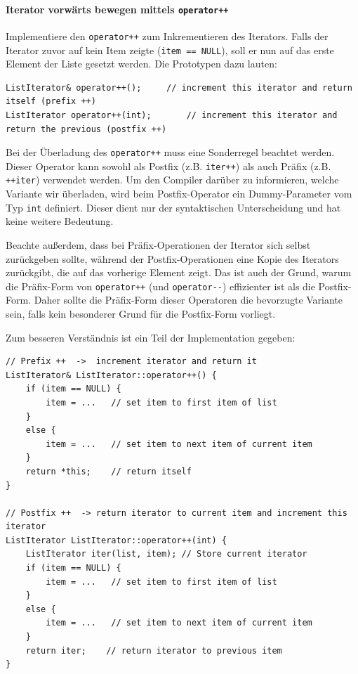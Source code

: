 \paragraph{Iterator vorwärts bewegen mittels \texttt{operator++}}

Implementiere den \texttt{operator++} zum Inkrementieren des Iterators.
Falls der Iterator zuvor auf kein Item zeigte (\texttt{item == NULL}), soll er nun auf das erste Element der Liste gesetzt werden.
Die Prototypen dazu lauten:
\begin{lstlisting}
ListIterator& operator++();		// increment this iterator and return itself (prefix ++)
ListIterator operator++(int);		// increment this iterator and return the previous (postfix ++)
\end{lstlisting}

Bei der Überladung des \texttt{operator++} muss eine Sonderregel beachtet werden.
Dieser Operator kann sowohl als Postfix (z.B. \texttt{iter++}) als auch Präfix (z.B. \texttt{++iter}) verwendet werden.
Um den Compiler darüber zu informieren, welche Variante wir überladen, wird beim Postfix-Operator ein Dummy-Parameter vom Typ \texttt{int} definiert.
Dieser dient nur der syntaktischen Unterscheidung und hat keine weitere Bedeutung.

Beachte außerdem, dass bei Präfix-Operationen der Iterator sich selbst zurückgeben sollte, während der Postfix-Operationen eine Kopie des Iterators zurückgibt, die auf das vorherige Element zeigt.
Das ist auch der Grund, warum die Präfix-Form von \texttt{operator++} (und \texttt{operator-{}-}) effizienter ist als die Postfix-Form.
Daher sollte die Präfix-Form dieser Operatoren die bevorzugte Variante sein, falls kein besonderer Grund für die Postfix-Form vorliegt.

Zum besseren Verständnis ist ein Teil der Implementation gegeben:

\begin{lstlisting}
// Prefix ++  ->  increment iterator and return it
ListIterator& ListIterator::operator++() {
	if (item == NULL) {
		item = ...	 // set item to first item of list
	}
	else {
		item = ...	 // set item to next item of current item
	}
	return *this;	 // return itself
}

// Postfix ++  -> return iterator to current item and increment this iterator
ListIterator ListIterator::operator++(int) {
	ListIterator iter(list, item); // Store current iterator
	if (item == NULL) {
		item = ...	 // set item to first item of list
	}
	else {
		item = ...	 // set item to next item of current item
	}
	return iter; 	// return iterator to previous item
}
\end{lstlisting}


